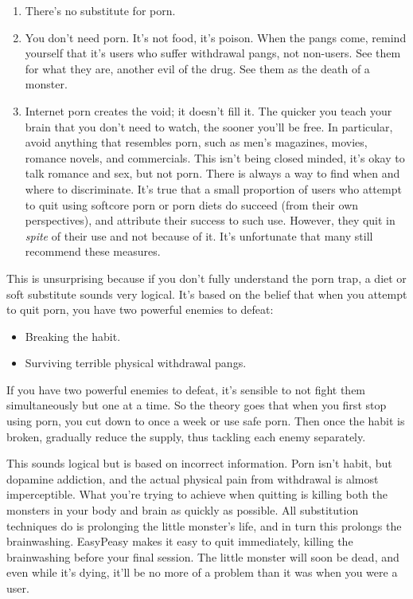 \documentclass[
]{book}
\begin{document}
\begin{enumerate}
\def\labelenumi{\arabic{enumi}.}
\item
  There's no substitute for porn.
\item
  You don't need porn. It's not food, it's poison. When the pangs come, remind yourself that it's users who suffer withdrawal pangs, not non-users. See them for what they are, another evil of the drug. See them as the death of a monster.
\item
  Internet porn creates the void; it doesn't fill it. The quicker you teach your brain that you don't need to watch, the sooner you'll be free. In particular, avoid anything that resembles porn, such as men's magazines, movies, romance novels, and commercials. This isn't being closed minded, it's okay to talk romance and sex, but not porn. There is always a way to find when and where to discriminate. It's true that a small proportion of users who attempt to quit using softcore porn or porn diets do succeed (from their own perspectives), and attribute their success to such use. However, they quit in \emph{spite} of their use and not because of it. It's unfortunate that many still recommend these measures.
\end{enumerate}

This is unsurprising because if you don't fully understand the porn trap, a diet or soft substitute sounds very logical. It's based on the belief that when you attempt to quit porn, you have two powerful enemies to defeat:

\begin{itemize}
\item
  Breaking the habit.
\item
  Surviving terrible physical withdrawal pangs.
\end{itemize}

If you have two powerful enemies to defeat, it's sensible to not fight them simultaneously but one at a time. So the theory goes that when you first stop using porn, you cut down to once a week or use safe porn. Then once the habit is broken, gradually reduce the supply, thus tackling each enemy separately.

This sounds logical but is based on incorrect information. Porn isn't habit, but dopamine addiction, and the actual physical pain from withdrawal is almost imperceptible. What you're trying to achieve when quitting is killing both the monsters in your body and brain as quickly as possible. All substitution techniques do is prolonging the little monster's life, and in turn this prolongs the brainwashing. EasyPeasy makes it easy to quit immediately, killing the brainwashing before your final session. The little monster will soon be dead, and even while it's dying, it'll be no more of a problem than it was when you were a user.
\end{document}
